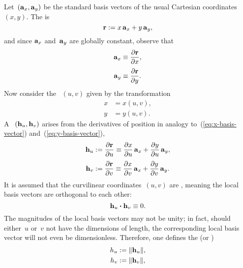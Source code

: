 Let~$(\mathop{}\!\boldsymbol{\mathbf{a}}_{x}, \mathop{}\!\boldsymbol{\mathbf{a}}_{y})$ be the standard basis vectors
of the usual Cartesian coordinates~$(x, y)$.
The  is
\begin{equation}
  \boldsymbol{\mathbf{r}} := x \mathop{}\!\boldsymbol{\mathbf{a}}_{x} + y \mathop{}\!\boldsymbol{\mathbf{a}}_{y},
  \label{eq:position-vector-cartesian}
\end{equation}
and since $\mathop{}\!\boldsymbol{\mathbf{a}}_{x}$ and~$\mathop{}\!\boldsymbol{\mathbf{a}}_{y}$ are globally constant,
observe that
\begin{align}
  \basisvec{x} &\ideq \pder{\positionvec}{x},
    \label{eq:x-basis-vector} \\[\tallspace]
  \basisvec{y} &\ideq \pder{\positionvec}{y}.
    \label{eq:y-basis-vector}
\end{align}
Now consider the ~$(u, v)$
given by the transformation
\begin{align}
  x &= x (u, v), \label{eq:x-transformation-curvilinear} \\
  y &= y (u, v). \label{eq:y-transformation-curvilinear}
\end{align}
A ~$(\mathop{}\!\boldsymbol{\mathbf{h}}_{u}, \mathop{}\!\boldsymbol{\mathbf{h}}_{v})$
arises from the derivatives of position
in analogy to~(\ref{eq:x-basis-vector}) and~(\ref{eq:y-basis-vector}),
\begin{align}
  \localvec{u} &
    \defeq \pder{\positionvec}{u}
    \ideq \pder{x}{u} \basisvec{x} + \pder{y}{u} \basisvec{y},
      \label{eq:u-local-basis-vector} \\[\tallspace]
  \localvec{v} &
    \defeq \pder{\positionvec}{v}
    \ideq \pder{x}{v} \basisvec{x} + \pder{y}{v} \basisvec{y}.
      \label{eq:v-local-basis-vector}
\end{align}
It is assumed that the curvilinear coordinates~$(u, v)$ are ,
meaning the local basis vectors are orthogonal to each other:
\begin{equation}
  \mathop{}\!\boldsymbol{\mathbf{h}}_{u} \boldsymbol{\cdot} \mathop{}\!\boldsymbol{\mathbf{h}}_{v} \equiv 0.
  \label{eq:local-basis-orthogonal}
\end{equation}
The magnitudes of the local basis vectors may not be unity;
in fact, should either~$u$ or~$v$ not have the dimensions of length,
the corresponding local basis vector will not even be dimensionless.
Therefore, one defines the 
(or )
\begin{align}
  \scalefac[u] &\defeq \norm{\localvec{u}}, \label{eq:u-scale-factor} \\
  \scalefac[v] &\defeq \norm{\localvec{v}}, \label{eq:v-scale-factor}
\end{align}
